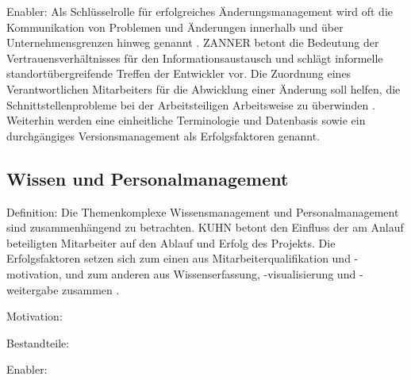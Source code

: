 Enabler: 
Als Schlüsselrolle für erfolgreiches Änderungsmanagement wird oft die Kommunikation von Problemen und Änderungen innerhalb und über Unternehmensgrenzen hinweg genannt \cite{Kuhn2002, Schuh2008}.
ZANNER betont die Bedeutung der Vertrauensverhältnisses für den Informationsaustausch und schlägt informelle standortübergreifende Treffen der Entwickler vor. Die Zuordnung eines Verantwortlichen Mitarbeiters für die Abwicklung einer Änderung soll helfen, die Schnittstellenprobleme bei der Arbeitsteiligen Arbeitsweise zu überwinden  \cite[42]{Zanner2002}.
Weiterhin werden eine einheitliche Terminologie \cite{Zanner2002} und Datenbasis sowie ein durchgängiges Versionsmanagement \cite{Kuhn2002} als Erfolgsfaktoren genannt. 

\subsection{Wissen und Personalmanagement}

Definition: 
Die Themenkomplexe Wissensmanagement und Personalmanagement sind zusammenhängend zu betrachten. KUHN betont den Einfluss der am Anlauf beteiligten Mitarbeiter auf den Ablauf und Erfolg des Projekts. Die Erfolgsfaktoren setzen sich zum einen aus Mitarbeiterqualifikation und -motivation, und zum anderen aus Wissenserfassung, -visualisierung und -weitergabe zusammen \cite[31]{Kuhn2002}. 

Motivation: 

Bestandteile: 

Enabler: 

% 
% 
% 
% 
% 


